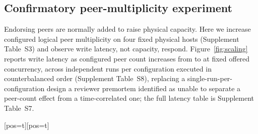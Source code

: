 \documentclass[a4paper,fleqn]{cas-sc}
\makeatletter
\newenvironment{widefig}[1][pos=t]
  {\ifdoublecol \@nameuse{figure*}[#1]\else \@nameuse{figure}[#1]\fi}
  {\ifdoublecol \@nameuse{endfigure*}\else \@nameuse{endfigure}\fi}
\makeatother
\begin{document}
\subsection{Confirmatory peer-multiplicity experiment}
\label{subsec:scaling}

Endorsing peers are normally added to raise physical capacity. Here we
increase configured logical peer multiplicity on four fixed physical
hosts (Supplement Table~S3) and observe write latency, not capacity,
respond. Figure~\ref{fig:scaling} reports write latency as configured peer
count increases from \ScaleMinPeers{} to \ScaleMaxPeers{} at fixed offered
concurrency, across \PartRunsPerConfig{} independent runs per configuration
executed in counterbalanced order (Supplement Table~S8), replacing a
single-run-per-configuration design a reviewer premortem identified as
unable to separate a peer-count effect from a time-correlated one; the
full latency table is Supplement Table~S7.

\begin{widefig}
\centering
{}
\caption{Write latency by configured logical peer multiplicity. Small,
  semi-transparent points are the \PartRunsPerConfig{} individual live-run
  means at each peer count (colour identifies the counterbalanced block,
  Supplement Table~S8), jittered horizontally so overlapping runs remain
  visible; large markers and error bars show the group mean and its 95\%
  CI (P95 as a separate series). The experiment varied logical peers on
  four fixed physical hosts and did not measure throughput as a function
  of peer count (Section~\ref{subsec:scaling}); the concurrency-throughput
  experiment in Section~\ref{subsec:throughput} used a fixed peer
  configuration.}
\label{fig:scaling}
\end{widefig}
\end{document}
